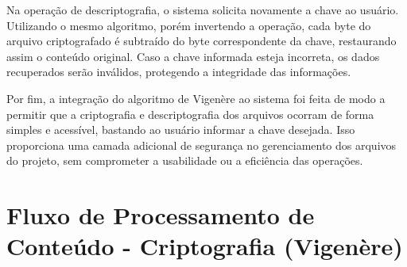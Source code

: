 \documentclass[12pt]{article}
\begin{document}
Na operação de descriptografia, o sistema solicita novamente a chave ao usuário. Utilizando o mesmo algoritmo, porém invertendo a operação, cada byte do arquivo criptografado é subtraído do byte correspondente da chave, restaurando assim o conteúdo original. Caso a chave informada esteja incorreta, os dados recuperados serão inválidos, protegendo a integridade das informações.

Por fim, a integração do algoritmo de Vigenère ao sistema foi feita de modo a permitir que a criptografia e descriptografia dos arquivos ocorram de forma simples e acessível, bastando ao usuário informar a chave desejada. Isso proporciona uma camada adicional de segurança no gerenciamento dos arquivos do projeto, sem comprometer a usabilidade ou a eficiência das operações.

\section*{Fluxo de Processamento de Conteúdo - Criptografia (Vigenère)} 
\begin{center} 
\end{center}
\end{document}
